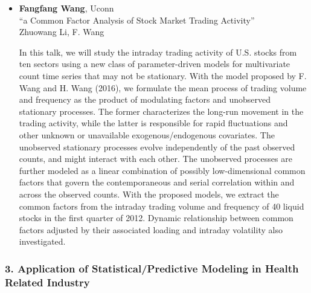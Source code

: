 \begin{itemize}
\item \textbf{Fangfang Wang}, Uconn \\
``a Common Factor Analysis of Stock Market Trading Activity'' \\
Zhuowang Li, F. Wang


In this talk, we will study the intraday trading activity of U.S. stocks from ten sectors using a new class of parameter-driven models for multivariate count time series that may not be stationary. With the  model proposed by F. Wang and H. Wang (2016), we formulate the mean process of trading volume and frequency as the product of modulating factors and unobserved stationary processes. The former characterizes the long-run movement in the trading activity, while the latter is responsible for rapid fluctuations and other unknown or unavailable exogenous/endogenous covariates. The unobserved stationary processes evolve independently of the past observed counts, and might interact with each other. The unobserved processes are further modeled as a linear combination of possibly low-dimensional common factors that govern the contemporaneous and serial correlation within and across the observed counts. With the proposed models, we extract the common factors from the intraday trading volume and  frequency of 40 liquid stocks in the first quarter of 2012. Dynamic relationship between common factors adjusted by their associated loading and intraday volatility also investigated.   

\end{itemize}

\subsubsection*{3. Application of Statistical/Predictive Modeling in Health Related Industry}

